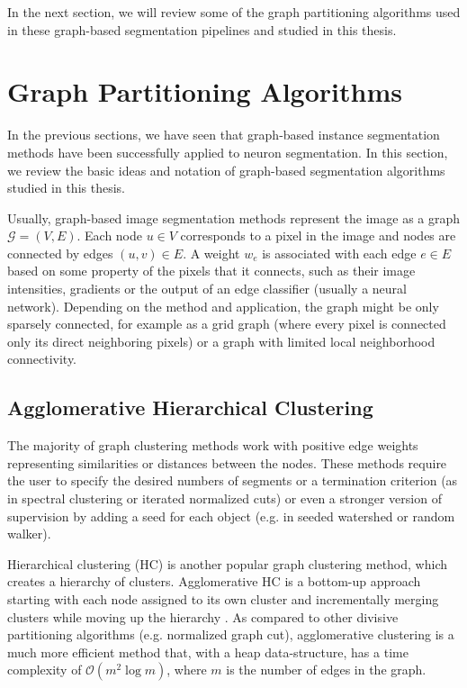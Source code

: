 In the next section, we will review some of the graph partitioning algorithms used in these graph-based segmentation pipelines and studied in this thesis.


\section{Graph Partitioning Algorithms}\label{sec:graph_partitioning_intro}
In the previous sections, we have seen that graph-based instance segmentation methods have been successfully applied to neuron segmentation. In this section, we review the basic ideas and notation of graph-based segmentation algorithms studied in this thesis.

Usually, graph-based image segmentation methods represent the image as a graph $\mathcal{G}=(V,E)$. Each node $u\in V$ corresponds to a pixel in the image and nodes are connected by edges $(u,v)\in E$. A weight $w_e$ is associated with each edge $e \in E$ based on some property of the pixels that it connects, such as their image intensities, gradients or the output of an edge classifier (usually a neural network). Depending on the method and application, the graph might be only sparsely connected, for example as a grid graph (where every pixel is connected only its direct neighboring pixels) or a graph with limited local neighborhood connectivity.

\subsection{Agglomerative Hierarchical Clustering}
The majority of graph clustering methods work with positive edge weights representing similarities or distances between the nodes. These methods require the user to specify the desired numbers of segments or a termination criterion (as in spectral clustering or iterated normalized cuts) or even a stronger version of supervision by adding a seed for each object (e.g. in seeded watershed or random walker).  

Hierarchical clustering (HC) is another popular graph clustering method, which creates a hierarchy of clusters. Agglomerative HC is a bottom-up approach starting with each node assigned to its own cluster and incrementally merging clusters while moving up the hierarchy \cite{lance1967general}. As compared to other divisive partitioning algorithms (e.g. normalized graph cut), agglomerative clustering is a much more efficient method that, with a heap data-structure, has a time complexity of $\mathcal{O}(m^2 \log m)$, where $m$ is the number of edges in the graph. 

